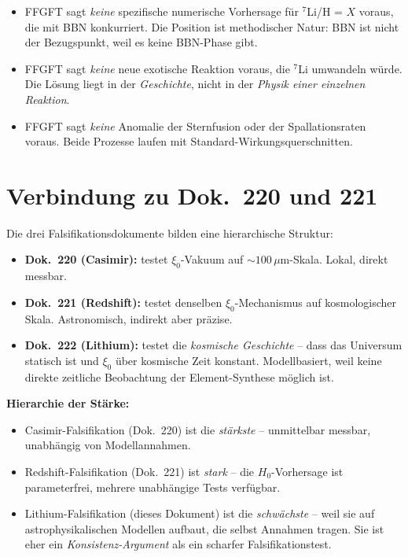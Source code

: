 \begin{itemize}[leftmargin=2em,itemsep=2pt,topsep=2pt]
  \item FFGFT sagt \emph{keine} spezifische numerische Vorhersage
        für $^7$Li/H = $X$ voraus, die mit BBN konkurriert. Die
        Position ist methodischer Natur: BBN ist nicht der
        Bezugspunkt, weil es keine BBN-Phase gibt.
  \item FFGFT sagt \emph{keine} neue exotische Reaktion voraus, die
        $^7$Li umwandeln würde. Die Lösung liegt in der
        \emph{Geschichte}, nicht in der \emph{Physik einer
        einzelnen Reaktion}.
  \item FFGFT sagt \emph{keine} Anomalie der Sternfusion oder der
        Spallationsraten voraus. Beide Prozesse laufen mit
        Standard-Wirkungsquerschnitten.
\end{itemize}

\section{Verbindung zu Dok.~220 und 221}

Die drei Falsifikationsdokumente bilden eine hierarchische Struktur:

\begin{itemize}[leftmargin=2em,itemsep=2pt,topsep=2pt]
  \item \textbf{Dok.~220 (Casimir):} testet $\xi_0$-Vakuum auf
        $\sim 100\,\mu$m-Skala. Lokal, direkt messbar.
  \item \textbf{Dok.~221 (Redshift):} testet denselben
        $\xi_0$-Mechanismus auf kosmologischer Skala. Astronomisch,
        indirekt aber präzise.
  \item \textbf{Dok.~222 (Lithium):} testet die
        \emph{kosmische Geschichte} -- dass das Universum statisch
        ist und $\xi_0$ über kosmische Zeit konstant. Modellbasiert,
        weil keine direkte zeitliche Beobachtung der
        Element-Synthese möglich ist.
\end{itemize}

\textbf{Hierarchie der Stärke:}
\begin{itemize}[leftmargin=2em,itemsep=2pt,topsep=2pt]
  \item Casimir-Falsifikation (Dok.~220) ist die \emph{stärkste} --
        unmittelbar messbar, unabhängig von Modellannahmen.
  \item Redshift-Falsifikation (Dok.~221) ist \emph{stark} -- die
        $H_0$-Vorhersage ist parameterfrei, mehrere unabhängige
        Tests verfügbar.
  \item Lithium-Falsifikation (dieses Dokument) ist die
        \emph{schwächste} -- weil sie auf astrophysikalischen
        Modellen aufbaut, die selbst Annahmen tragen. Sie ist
        eher ein \emph{Konsistenz-Argument} als ein scharfer
        Falsifikationstest.
\end{itemize}

